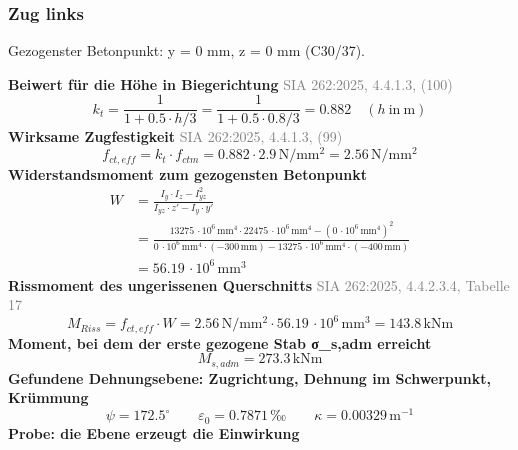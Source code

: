 \documentclass[11pt,a4paper]{article}
\newcommand{\normref}[1]{{\small\textcolor{gray}{#1}}}
\begin{document}
\subsubsection{Zug links}
Gezogenster Betonpunkt: y = 0 mm, z = 0 mm (C30/37).

\noindent\textbf{Beiwert für die Höhe in Biegerichtung} \hfill \normref{SIA 262:2025, 4.4.1.3, (100)}
\begin{equation*}
k_t = \frac{1}{1 + 0.5 \cdot h/3} = \frac{1}{1 + 0.5 \cdot 0.8/3} = 0.882 \quad \left(h\ \text{in}\ \mathrm{m}\right)
\end{equation*}
\noindent\textbf{Wirksame Zugfestigkeit} \hfill \normref{SIA 262:2025, 4.4.1.3, (99)}
\begin{equation*}
f_{ct,eff} = k_t \cdot f_{ctm} = 0.882 \cdot 2.9\,\mathrm{N}/\mathrm{mm}^{2} = 2.56\,\mathrm{N}/\mathrm{mm}^{2}
\end{equation*}
\noindent\textbf{Widerstandsmoment zum gezogensten Betonpunkt}
\begin{equation*}
\begin{aligned}
  W &= \frac{I_y \cdot I_z - I_{yz}^{2}}{I_{yz} \cdot z' - I_y \cdot y'} \\
  &= \frac{13275\,\cdot 10^{6}\,\mathrm{mm}^{4} \cdot 22475\,\cdot 10^{6}\,\mathrm{mm}^{4} - \left(0\,\cdot 10^{6}\,\mathrm{mm}^{4}\right)^{2}}{0\,\cdot 10^{6}\,\mathrm{mm}^{4} \cdot \left(-300\,\mathrm{mm}\right) - 13275\,\cdot 10^{6}\,\mathrm{mm}^{4} \cdot \left(-400\,\mathrm{mm}\right)} \\
  &= 56.19\,\cdot 10^{6}\,\mathrm{mm}^{3}
\end{aligned}
\end{equation*}
\noindent\textbf{Rissmoment des ungerissenen Querschnitts} \hfill \normref{SIA 262:2025, 4.4.2.3.4, Tabelle 17}
\begin{equation*}
M_{Riss} = f_{ct,eff} \cdot W = 2.56\,\mathrm{N}/\mathrm{mm}^{2} \cdot 56.19\,\cdot 10^{6}\,\mathrm{mm}^{3} = 143.8\,\mathrm{kNm}
\end{equation*}
\noindent\textbf{Moment, bei dem der erste gezogene Stab σ\_s,adm erreicht}
\begin{equation*}
M_{s,adm} = 273.3\,\mathrm{kNm}
\end{equation*}
\noindent\textbf{Gefundene Dehnungsebene: Zugrichtung, Dehnung im Schwerpunkt, Krümmung}
\begin{equation*}
\psi = 172.5^\circ \qquad \varepsilon_0 = 0.7871\,\text{‰} \qquad \kappa = 0.00329\,\mathrm{m}^{-1}
\end{equation*}
\noindent\textbf{Probe: die Ebene erzeugt die Einwirkung}
\end{document}
